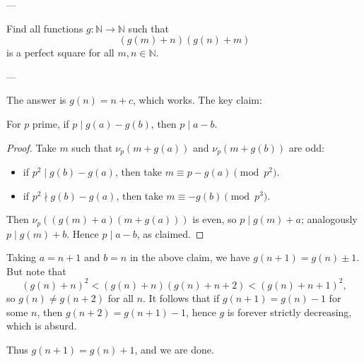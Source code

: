 
---

Find all functions $g:\mathbb N\to\mathbb N$ such that \[(g(m)+n)(g(n)+m)\]
is a perfect square for all $m,n\in\mathbb N$.

---

The answer is $g(n)=n+c$, which works. The key claim:
\begin{iclaim*}
    For $p$ prime, if $p\mid g(a)-g(b)$, then $p\mid a-b$.
\end{iclaim*}
\begin{proof}
    Take $m$ such that $\nu_p(m+g(a))$ and $\nu_p(m+g(b))$ are odd:
    \begin{itemize}[itemsep=0em]
        \item if $p^2\mid g(b)-g(a)$, then take $m\equiv p-g(a)\pmod{p^2}$.
        \item if $p^2\nmid g(b)-g(a)$, then take $m\equiv -g(b)\pmod{p^3}$.
    \end{itemize}
    Then $\nu_p( (g(m)+a)(m+g(a)))$ is even, so $p\mid g(m)+a$; analogously $p\mid g(m)+b$. Hence $p\mid a-b$, as claimed.
\end{proof}

Taking $a=n+1$ and $b=n$ in the above claim, we have $g(n+1)=g(n)\pm1$. But note that \[(g(n)+n)^2<(g(n)+n)(g(n)+n+2)<(g(n)+n+1)^2,\]
so $g(n)\ne g(n+2)$ for all $n$. It follows that if $g(n+1)=g(n)-1$ for some $n$, then $g(n+2)=g(n+1)-1$, hence $g$ is forever strictly decreasing, which is absurd.

Thus $g(n+1)=g(n)+1$, and we are done.


